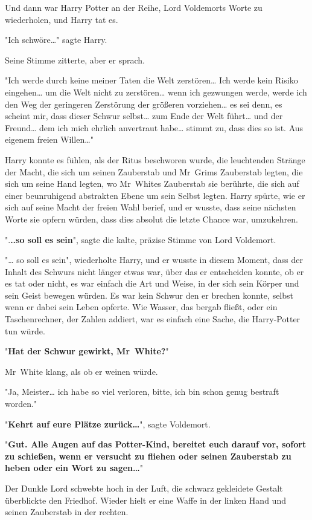{Und dann war Harry Potter an der Reihe, Lord Voldemorts Worte zu wiederholen, und Harry tat es.

"Ich schwöre…" sagte Harry.

Seine Stimme zitterte, aber er sprach.

"Ich werde durch keine meiner Taten die Welt zerstören… Ich werde kein Risiko eingehen… um die Welt nicht zu zerstören… wenn ich gezwungen werde, werde ich den Weg der geringeren Zerstörung der größeren vorziehen… es sei denn, es scheint mir, dass dieser Schwur selbst… zum Ende der Welt führt… und der Freund… dem ich mich ehrlich anvertraut habe… stimmt zu, dass dies so ist. Aus eigenem freien Willen…"

Harry konnte es fühlen, als der Ritus beschworen wurde, die leuchtenden Stränge der Macht, die sich um seinen Zauberstab und Mr~Grims Zauberstab legten, die sich um seine Hand legten, wo Mr~Whites Zauberstab sie berührte, die sich auf einer beunruhigend abstrakten Ebene um sein Selbst legten. Harry spürte, wie er sich auf seine Macht der freien Wahl berief, und er wusste, dass seine nächsten Worte sie opfern würden, dass dies absolut die letzte Chance war, umzukehren.

".\textbf{..so soll es sein}", sagte die kalte, präzise Stimme von Lord Voldemort.

"… so soll es sein", wiederholte Harry, und er wusste in diesem Moment, dass der Inhalt des Schwurs nicht länger etwas war, über das er entscheiden konnte, ob er es tat oder nicht, es war einfach die Art und Weise, in der sich sein Körper und sein Geist bewegen würden. Es war kein Schwur den er brechen konnte, selbst wenn er dabei sein Leben opferte. Wie Wasser, das bergab fließt, oder ein Taschenrechner, der Zahlen addiert, war es einfach eine Sache, die Harry-Potter tun würde.

"\textbf{Hat der Schwur gewirkt, Mr~White?}"

Mr~White klang, als ob er weinen würde.

"Ja, Meister… ich habe so viel verloren, bitte, ich bin schon genug bestraft worden."

"\textbf{Kehrt auf eure Plätze zurück…}", sagte Voldemort.

"\textbf{Gut. Alle Augen auf das Potter-Kind, bereitet euch darauf vor, sofort zu schießen, wenn er versucht zu fliehen oder seinen Zauberstab zu heben oder ein Wort zu sagen…}"

Der Dunkle Lord schwebte hoch in der Luft, die schwarz gekleidete Gestalt überblickte den Friedhof. Wieder hielt er eine Waffe in der linken Hand und seinen Zauberstab in der rechten.

}
